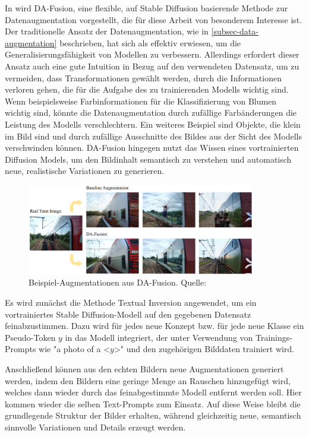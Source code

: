 In \parencite{Trabucco2023dafusion} wird DA-Fusion, eine flexible, auf Stable Diffusion basierende Methode zur Datenaugmentation vorgestellt, die für diese Arbeit von besonderem Interesse ist. Der traditionelle Ansatz der Datenaugmentation, wie in \ref{subsec-data-augmentation} beschrieben, hat sich als effektiv erwiesen, um die Generalisierungsfähigkeit von Modellen zu verbessern. Allerdings erfordert dieser Ansatz auch eine gute Intuition in Bezug auf den verwendeten Datensatz, um zu vermeiden, dass Transformationen gewählt werden, durch die Informationen verloren gehen, die für die Aufgabe des zu trainierenden Modells wichtig sind. Wenn beispielsweise Farbinformationen für die Klassifizierung von Blumen wichtig sind, könnte die Datenaugmentation durch zufällige Farbänderungen die Leistung des Modells verschlechtern. Ein weiteres Beispiel sind Objekte, die klein im Bild sind und durch zufällige Ausschnitte des Bildes aus der Sicht des Modells verschwinden können. DA-Fusion hingegen nutzt das Wissen eines vortrainierten Diffusion Models, um den Bildinhalt semantisch zu verstehen und automatisch neue, realistische Variationen zu generieren.

\begin{figure}[h] \label{figure-da-fusion}
	\includegraphics[width=10cm]{figure_da-fusion.png}
	\caption{Beispiel-Augmentationen aus DA-Fusion. Quelle: \parencite{Trabucco2023dafusion}}
\end{figure}

Es wird zunächst die Methode Textual Inversion \parencite{} angewendet, um ein vortrainiertes Stable Diffusion-Modell auf den gegebenen Datensatz feinabzustimmen. Dazu wird für jedes neue Konzept bzw. für jede neue Klasse ein Pseudo-Token $y$ in das Modell integriert, der unter Verwendung von Trainings-Prompts wie "a photo of a <$y$>" und den zugehörigen Bilddaten trainiert wird.

Anschließend können aus den echten Bildern neue Augmentationen generiert werden, indem den Bildern eine geringe Menge an Rauschen hinzugefügt wird, welches dann wieder durch das feinabgestimmte Modell entfernt werden soll. Hier kommen wieder die selben Text-Prompts zum Einsatz. Auf diese Weise bleibt die grundlegende Struktur der Bilder erhalten, während gleichzeitig neue, semantisch sinnvolle Variationen und Details erzeugt werden.

